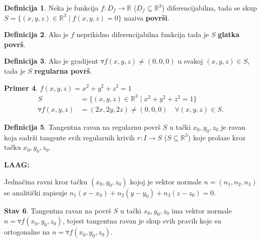 \documentclass[11pt]{article}
\newcommand{\real}{\mathbb{R}}
\theoremstyle{definition}
\newtheorem{definicija}{Definicija}[section]
\newtheorem{primer}[definicija]{Primer}
\newtheorem{stav}[definicija]{Stav}
\theoremstyle{serbnodot}
\begin{document}
\begin{definicija}
    Neka je funkcija \(f: D_f \to \real\) (\(D_f \subseteq \real^3\)) diferencijabilna,
    tada se skup \(S = \{(x,y,z) \in \real^3 \mid f(x,y,z) = 0\}\) naziva \textbf{površi}.
\end{definicija}

\begin{definicija}
    Ako je \(f\) neprikidno diferencijabilna funkcija tada je \(S\) \textbf{glatka površ}.
\end{definicija}

\begin{definicija}
    Ako je gradijent \(\triangledown f(x,y,z) \neq (0,0,0)\) u svakoj 
    \((x,y,z) \in S\), tada je \(S\) \textbf{regularna površ}.
\end{definicija}

\begin{primer}
    \(f(x,y,z) = x^2+y^2+z^2=1\)
    \begin{align*}
        S &= \{(x,y,z) \in \real^3 \mid x^2+y^2+z^2=1\} \\
        \triangledown f(x,y,z) &= (2x,2y,2z) \neq (0,0,0) \quad \forall (x,y,z) \in S.
    \end{align*}
\end{primer}

\begin{definicija}
    Tangentna ravan na regularnu površ \(S\) u tački \(x_0, y_0, z_0\)
    je ravan koja sadrži tangente svih regularnih krivih \(r: I\to S\)
     (\(S \subseteq \real^3\)) koje prolaze kroz tačku \(x_0, y_0, z_0\).
\end{definicija}

\textbf{LAAG:}

Jednačina ravni kroz tačku \((x_0, y_0, z_0)\) kojoj je vektor normale
\(n = (n_1, n_2, n_3)\) se analitički zapisuje 
\(n_1(x-x_0) + n_2(y-y_0)+n_3(z-z_0) = 0\).

\begin{stav}
    Tangentna ravan na površ \(S\) u tački \(x_0, y_0, z_0\) ima vektor normale
    \(n = \triangledown f (x_0, y_0, z_0)\), tojest tangentna ravan je skup svih 
    pravih koje su ortogonalne na \(n = \triangledown f (x_0, y_0, z_0)\).
\end{stav}
\end{document}
